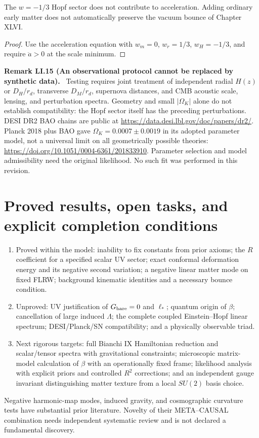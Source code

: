\documentclass[11pt,a4paper,oneside]{book}
\newcommand{\statement}[3]{\par\medskip\noindent\textbf{#1 #2 (#3).}\ }
\begin{document}
The $w=-1/3$ Hopf sector does not contribute to acceleration. Adding ordinary early matter does not automatically preserve the vacuum bounce of Chapter XLVI.
\begin{proof}
Use the acceleration equation with $w_m=0$, $w_r=1/3$, $w_H=-1/3$, and require $\ddot a>0$ at the scale minimum.
\end{proof}
\statement{Remark}{LI.15}{An observational protocol cannot be replaced by synthetic data}
Testing requires joint treatment of independent radial $H(z)$ or $D_H/r_d$, transverse $D_M/r_d$, supernova distances, and CMB acoustic scale, lensing, and perturbation spectra. Geometry and small $|\Omega_K|$ alone do not establish compatibility: the Hopf sector itself has the preceding perturbations. DESI DR2 BAO chains are public at \url{https://data.desi.lbl.gov/doc/papers/dr2/}. Planck 2018 plus BAO gave $\Omega_K=0.0007\pm0.0019$ in its adopted parameter model, not a universal limit on all geometrically possible theories: \url{https://doi.org/10.1051/0004-6361/201833910}. Parameter selection and model admissibility need the original likelihood. No such fit was performed in this revision.
\section{Proved results, open tasks, and explicit completion conditions}
\begin{enumerate}
\item Proved within the model: inability to fix constants from prior axioms; the $R$ coefficient for a specified scalar UV sector; exact conformal deformation energy and its negative second variation; a negative linear matter mode on fixed FLRW; background kinematic identities and a necessary bounce condition.
\item Unproved: UV justification of $G_{\rm bare}=0$ and $\ell_*$; quantum origin of $\beta$; cancellation of large induced $\Lambda$; the complete coupled Einstein--Hopf linear spectrum; DESI/Planck/SN compatibility; and a physically observable triad.
\item Next rigorous targets: full Bianchi IX Hamiltonian reduction and scalar/tensor spectra with gravitational constraints; microscopic matrix-model calculation of $\beta$ with an operationally fixed frame; likelihood analysis with explicit priors and controlled $R^2$ corrections; and an independent gauge invariant distinguishing matter texture from a local $SU(2)$ basis choice.
\end{enumerate}
Negative harmonic-map modes, induced gravity, and cosmographic curvature tests have substantial prior literature. Novelty of their META--CAUSAL combination needs independent systematic review and is not declared a fundamental discovery.
\end{document}
